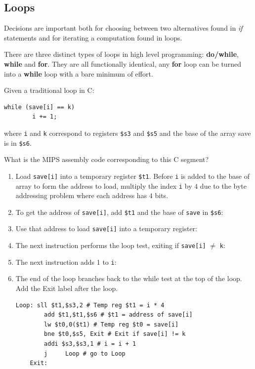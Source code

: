 \documentclass[10pt,a4paper]{article}
\begin{document}
\subsection{Loops}

Decisions are important both for choosing between two alternatives found in \textit{if} statements
and for iterating a computation found in loops.

There are three distinct types of loops in high level programming: \textbf{do/while}, \textbf{while}
and \textbf{for}. They are all functionally identical, any \textbf{for} loop can be turned into a
\textbf{while} loop with a bare minimum of effort.

Given a traditional loop in C:
\begin{lstlisting}[numbers=none]
    while (save[i] == k)
        i += 1;
\end{lstlisting}
where \texttt{i} and \texttt{k} correspond to registers \texttt{\$s3} and \texttt{\$s5} and the base of the 
array save is in \texttt{\$s6}. 

What is the MIPS assembly code corresponding to this C segment?
\begin{enumerate}
    \item Load \texttt{save[i]} into a temporary register \texttt{\$t1}. Before \texttt{i} is added to the base of
    array to form the address to load, multiply the index \texttt{i} by $4$ due to the byte
    addressing problem where each address has $4$ bits.
    \item To get the address of \texttt{save[i]}, add \texttt{\$t1} and the base of \texttt{save} in \texttt{\$s6}:
    \item Use that address to load \texttt{save[i]} into a temporary register:
    \item The next instruction performs the loop test, exiting if \texttt{save[i]} $\neq$ \texttt{k}:
    \item The next instruction adds 1 to \texttt{i}:
    \item The end of the loop branches back to the while test at the top of the loop. Add the Exit
    label after the loop.
    \begin{lstlisting}[numbers=none]
    Loop: sll $t1,$s3,2 # Temp reg $t1 = i * 4
        add $t1,$t1,$s6 # $t1 = address of save[i]
        lw $t0,0($t1) # Temp reg $t0 = save[i]
        bne $t0,$s5, Exit # Exit if save[i] != k
        addi $s3,$s3,1 # i = i + 1
        j     Loop # go to Loop
    Exit:
    \end{lstlisting}
\end{enumerate}
\end{document}
